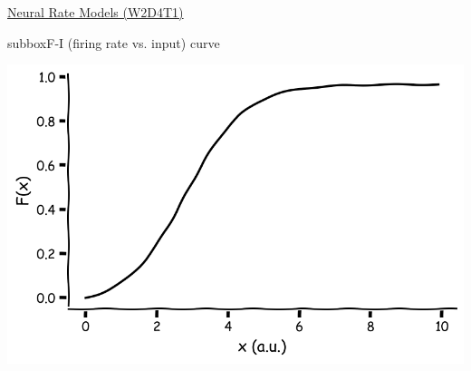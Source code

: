 \begin{textbox}{\href{https://compneuro.neuromatch.io/tutorials/W2D4_DynamicNetworks/chapter_title.html}{Neural Rate Models (W2D4T1)} }
\begin{subbox}{subbox}{F-I (firing rate vs. input) curve}
\begin{center}
\includegraphics[scale=0.18]{Figures/DN/DN_Figure1.png}
\end{center}
\end{subbox}

\end{textbox}
